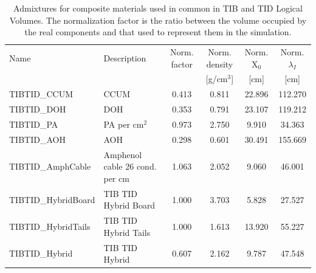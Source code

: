 \documentclass{cmspaper}
\begin{document}
\begin{table}[h!]
  \caption{Admixtures for composite materials used in common in TIB
  and TID Logical Volumes. The normalization factor is the ratio
  between the volume occupied by the real components and that used
  to represent them in the simulation.} 
  \label{tab:tibtid_common}
  \begin{center}
    \begin{tabular}{llcccc}
Name         & Description & Norm. factor & Norm. density            & Norm. X$_0$      & Norm. $\lambda_I$      \\
             &             &              &               [g/cm$^3$] &             [cm] &                   [cm] \\
\hline
TIBTID\_CCUM & CCUM    & 0.413 &                0.811   &        22.896   &       112.270   \\
TIBTID\_DOH  & DOH     & 0.353 &               0.791   &        23.107   &       119.212   \\
TIBTID\_PA   & PA per cm$^2$  & 0.973 &         2.750   &         9.910   &        34.363   \\
TIBTID\_AOH  & AOH            & 0.298 &        0.601   &        30.491   &       155.669   \\
TIBTID\_AmphCable & Amphenol cable 26 cond. per cm  & 1.063 &  2.052    & 9.060   &        46.001   \\
TIBTID\_HybridBoard & TIB TID Hybrid Board  &  1.000 &        3.703   &         5.828   &        27.527  \\
TIBTID\_HybridTails   & TIB TID Hybrid Tails &   1.000 &       1.613   &        13.920   &        55.227  \\
TIBTID\_Hybrid        & TIB TID Hybrid  &   0.607 &      2.162   &         9.787   &        47.548  \\
\hline
    \end{tabular}
  \end{center}
\end{table}

\end{document}
